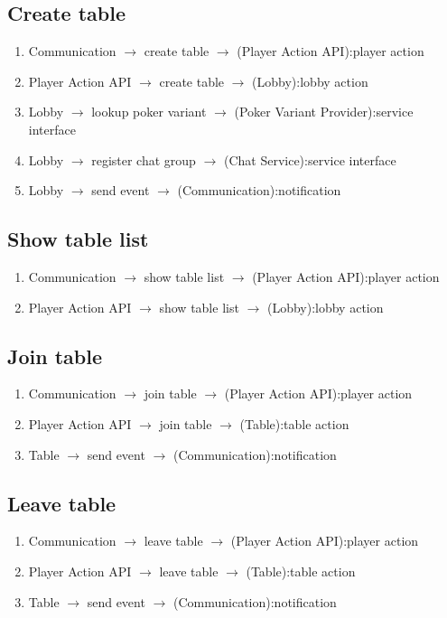 \documentclass[a4paper,11pt]{report}
\begin{document}
\subsection{Create table}
\begin{enumerate}
\item Communication $\rightarrow$ create table $\rightarrow$ (Player Action API):player action
\item Player Action API $\rightarrow$ create table $\rightarrow$ (Lobby):lobby action
\item Lobby $\rightarrow$ lookup poker variant $\rightarrow$ (Poker Variant Provider):service interface
\item Lobby $\rightarrow$ register chat group $\rightarrow$ (Chat Service):service interface
\item Lobby $\rightarrow$ send event $\rightarrow$ (Communication):notification
\end{enumerate}

\subsection{Show table list}
\begin{enumerate}
\item Communication $\rightarrow$ show table list $\rightarrow$ (Player Action API):player action
\item Player Action API $\rightarrow$ show table list $\rightarrow$ (Lobby):lobby action
\end{enumerate}

\subsection{Join table}
\begin{enumerate}
\item Communication $\rightarrow$ join table $\rightarrow$ (Player Action API):player action
\item Player Action API $\rightarrow$ join table $\rightarrow$ (Table):table action
\item Table $\rightarrow$ send event $\rightarrow$ (Communication):notification
\end{enumerate}

\subsection{Leave table}
\begin{enumerate}
\item Communication $\rightarrow$ leave table $\rightarrow$ (Player Action API):player action
\item Player Action API $\rightarrow$ leave table $\rightarrow$ (Table):table action
\item Table $\rightarrow$ send event $\rightarrow$ (Communication):notification
\end{enumerate}
\end{document}
